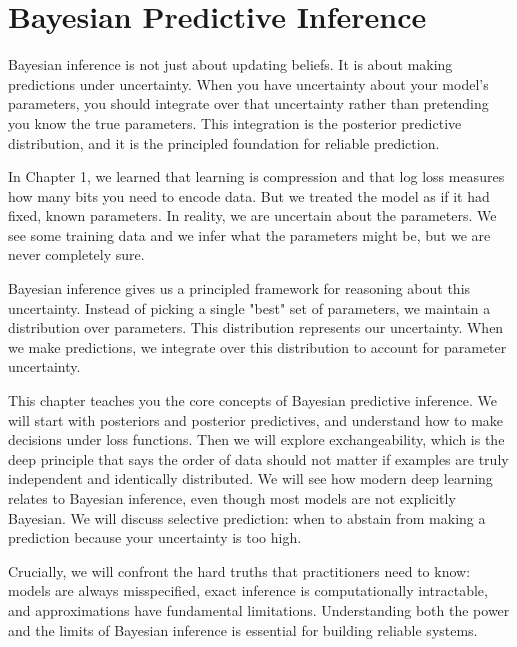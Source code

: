 
\chapter{Bayesian Predictive Inference}


\begin{keyinsight}
Bayesian inference is not just about updating beliefs. It is about making predictions under uncertainty. When you have uncertainty about your model's parameters, you should integrate over that uncertainty rather than pretending you know the true parameters. This integration is the posterior predictive distribution, and it is the principled foundation for reliable prediction.
\end{keyinsight}

\vspace{1.5em}

In Chapter 1, we learned that learning is compression and that log loss measures how many bits you need to encode data. But we treated the model as if it had fixed, known parameters. In reality, we are uncertain about the parameters. We see some training data and we infer what the parameters might be, but we are never completely sure.

Bayesian inference gives us a principled framework for reasoning about this uncertainty. Instead of picking a single "best" set of parameters, we maintain a distribution over parameters. This distribution represents our uncertainty. When we make predictions, we integrate over this distribution to account for parameter uncertainty.

This chapter teaches you the core concepts of Bayesian predictive inference. We will start with posteriors and posterior predictives, and understand how to make decisions under loss functions. Then we will explore exchangeability, which is the deep principle that says the order of data should not matter if examples are truly independent and identically distributed. We will see how modern deep learning relates to Bayesian inference, even though most models are not explicitly Bayesian. We will discuss selective prediction: when to abstain from making a prediction because your uncertainty is too high.

Crucially, we will confront the hard truths that practitioners need to know: models are always misspecified, exact inference is computationally intractable, and approximations have fundamental limitations. Understanding both the power and the limits of Bayesian inference is essential for building reliable systems.

